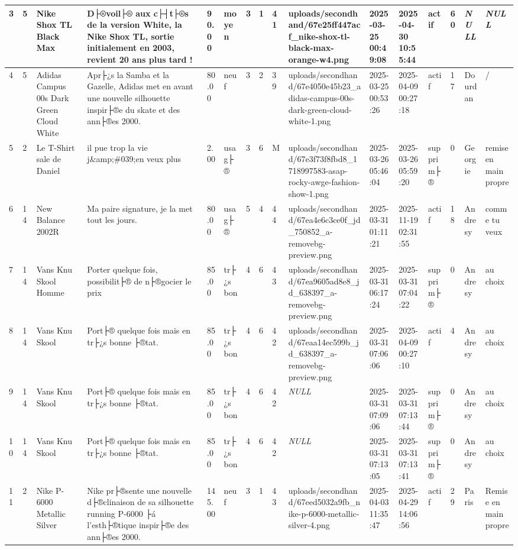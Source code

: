 \begin{longtable}{|l|l|l|l|l|l|l|l|l|l|l|l|l|l|l|l|}
3 & 5 & Nike Shox TL Black Max & D├®voil├® aux c├┤t├®s de la version White, la Nike Shox TL, sortie initialement en 2003, revient 20 ans plus tard ! & 90.00 & moyen & 3 & 1 & 41 & uploads/secondhand/67e25ff447acf\_nike-shox-tl-black-max-orange-w4.png & 2025-03-25 00:49:08 & 2025-04-30 10:55:44 & actif & 60 & \textit{NULL} & \textit{NULL} \\ \hline 
4 & 5 & Adidas Campus 00s Dark Green Cloud White & Apr├¿s la Samba et la Gazelle, Adidas met en avant une nouvelle silhouette inspir├®e du skate et des ann├®es 2000. & 80.00 & neuf & 3 & 2 & 39 & uploads/secondhand/67e4050e45b23\_adidas-campus-00s-dark-green-cloud-white-1.png & 2025-03-25 00:53:26 & 2025-04-09 00:27:18 & actif & 17 & Dourdan & / \\ \hline 
5 & 2 & Le T-Shirt sale de Daniel & il pue trop la vie j\&amp;\#039;en veux plus & 2.00 & usag├® & 3 & 6 & M & uploads/secondhand/67e3f73f8fbd8\_1718997583-asap-rocky-awge-fashion-show-1.png & 2025-03-26 05:46:04 & 2025-03-26 05:59:20 & supprim├® & 0 & Georgie & remise en main propre \\ \hline 
6 & 14 & New Balance 2002R & Ma paire signature, je la met tout les jours. & 80.00 & usag├® & 5 & 4 & 44 & uploads/secondhand/67ea4e6c3ce0f\_jd\_750852\_a-removebg-preview.png & 2025-03-31 01:11:21 & 2025-11-19 02:31:55 & actif & 18 & Andresy & comme tu veux \\ \hline 
7 & 14 & Vans Knu Skool Homme & Porter quelque fois, possibilit├® de n├®gocier le prix & 85.00 & tr├¿s bon & 4 & 6 & 43 & uploads/secondhand/67ea9605ad8e8\_jd\_638397\_a-removebg-preview.png & 2025-03-31 06:17:24 & 2025-03-31 07:04:22 & supprim├® & 0 & Andresy & au choix \\ \hline 
8 & 14 & Vans Knu Skool & Port├® quelque fois mais en tr├¿s bonne ├®tat. & 85.00 & tr├¿s bon & 4 & 6 & 42 & uploads/secondhand/67eaa14ec599b\_jd\_638397\_a-removebg-preview.png & 2025-03-31 07:06:06 & 2025-04-09 00:27:10 & actif & 4 & Andresy & au choix \\ \hline 
9 & 14 & Vans Knu Skool & Port├® quelque fois mais en tr├¿s bonne ├®tat. & 85.00 & tr├¿s bon & 4 & 6 & 42 & \textit{NULL} & 2025-03-31 07:09:06 & 2025-03-31 07:13:44 & supprim├® & 0 & Andresy & au choix \\ \hline 
10 & 14 & Vans Knu Skool & Port├® quelque fois mais en tr├¿s bonne ├®tat. & 85.00 & tr├¿s bon & 4 & 6 & 42 & \textit{NULL} & 2025-03-31 07:13:05 & 2025-03-31 07:13:41 & supprim├® & 0 & Andresy & au choix \\ \hline 
11 & 2 & Nike P-6000 Metallic Silver & Nike pr├®sente une nouvelle d├®clinaison de sa silhouette running P-6000 ├á l'esth├®tique inspir├®e des ann├®es 2000. & 145.00 & neuf & 3 & 1 & 43 & uploads/secondhand/67eed5032a9fb\_nike-p-6000-metallic-silver-4.png & 2025-04-03 11:35:47 & 2025-04-29 14:06:56 & actif & 29 & Paris & Remise en main propre \\ \hline 

\end{longtable}
